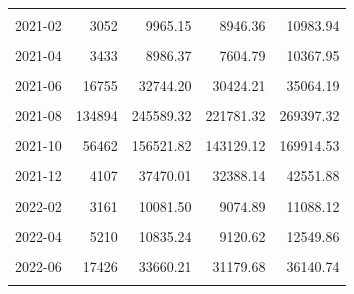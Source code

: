 \begin{longtable}[t]{crrrr}
\cellcolor{gray!10}{2021-01} & \cellcolor{gray!10}{3386} & \cellcolor{gray!10}{15220.45} & \cellcolor{gray!10}{12643.85} & \cellcolor{gray!10}{17797.05}\\
2021-02 & 3052 & 9965.15 & 8946.36 & 10983.94\\
\cellcolor{gray!10}{2021-03} & \cellcolor{gray!10}{2908} & \cellcolor{gray!10}{9331.77} & \cellcolor{gray!10}{7860.99} & \cellcolor{gray!10}{10802.55}\\
2021-04 & 3433 & 8986.37 & 7604.79 & 10367.95\\
\cellcolor{gray!10}{2021-05} & \cellcolor{gray!10}{8895} & \cellcolor{gray!10}{18392.29} & \cellcolor{gray!10}{16853.56} & \cellcolor{gray!10}{19931.02}\\
2021-06 & 16755 & 32744.20 & 30424.21 & 35064.19\\
\cellcolor{gray!10}{2021-07} & \cellcolor{gray!10}{28207} & \cellcolor{gray!10}{76858.10} & \cellcolor{gray!10}{71043.68} & \cellcolor{gray!10}{82672.52}\\
2021-08 & 134894 & 245589.32 & 221781.32 & 269397.32\\
\cellcolor{gray!10}{2021-09} & \cellcolor{gray!10}{125524} & \cellcolor{gray!10}{263598.14} & \cellcolor{gray!10}{244238.10} & \cellcolor{gray!10}{282958.18}\\
2021-10 & 56462 & 156521.82 & 143129.12 & 169914.53\\
\cellcolor{gray!10}{2021-11} & \cellcolor{gray!10}{9491} & \cellcolor{gray!10}{62506.02} & \cellcolor{gray!10}{51422.63} & \cellcolor{gray!10}{73589.41}\\
2021-12 & 4107 & 37470.01 & 32388.14 & 42551.88\\
\cellcolor{gray!10}{2022-01} & \cellcolor{gray!10}{4782} & \cellcolor{gray!10}{16650.24} & \cellcolor{gray!10}{14275.59} & \cellcolor{gray!10}{19024.89}\\
2022-02 & 3161 & 10081.50 & 9074.89 & 11088.12\\
\cellcolor{gray!10}{2022-03} & \cellcolor{gray!10}{2598} & \cellcolor{gray!10}{9126.73} & \cellcolor{gray!10}{7619.17} & \cellcolor{gray!10}{10634.29}\\
2022-04 & 5210 & 10835.24 & 9120.62 & 12549.86\\
\cellcolor{gray!10}{2022-05} & \cellcolor{gray!10}{13834} & \cellcolor{gray!10}{26134.96} & \cellcolor{gray!10}{22717.87} & \cellcolor{gray!10}{29552.05}\\
2022-06 & 17426 & 33660.21 & 31179.68 & 36140.74\\
\cellcolor{gray!10}{2022-07} & \cellcolor{gray!10}{18950} & \cellcolor{gray!10}{47345.21} & \cellcolor{gray!10}{43253.75} & \cellcolor{gray!10}{51436.67}\\

\end{longtable}
